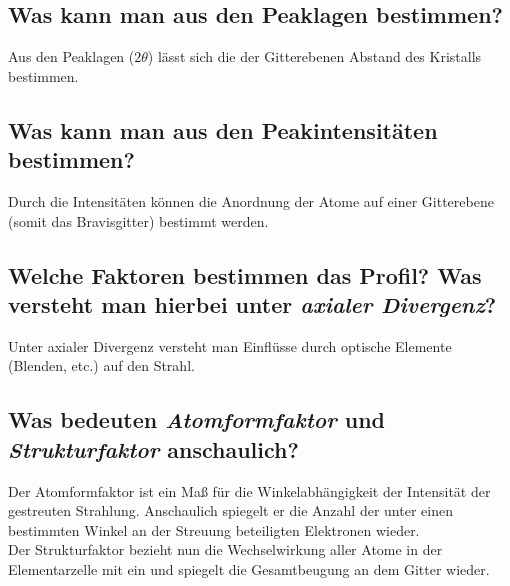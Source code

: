 \subsection*{Was kann man aus den Peaklagen bestimmen?}
Aus den Peaklagen ($2\theta$) lässt sich die der Gitterebenen Abstand des Kristalls bestimmen.
\subsection*{Was kann man aus den Peakintensitäten bestimmen?}
Durch die Intensitäten können die Anordnung der Atome auf einer Gitterebene (somit das Bravisgitter) bestimmt werden.
\subsection*{Welche Faktoren bestimmen das Profil? Was versteht man hierbei unter \textit{axialer Divergenz}?}
Unter axialer Divergenz versteht man Einflüsse durch optische Elemente (Blenden, etc.) auf den Strahl. \cite{Kleber}
\subsection*{Was bedeuten \textit{Atomformfaktor} und \textit{Strukturfaktor} anschaulich?}
Der Atomformfaktor ist ein Maß für die Winkelabhängigkeit der Intensität der gestreuten Strahlung.
Anschaulich spiegelt er die Anzahl der unter einen bestimmten Winkel an der Streuung beteiligten Elektronen wieder.\\
Der Strukturfaktor bezieht nun die Wechselwirkung aller Atome in der Elementarzelle mit ein und spiegelt die Gesamtbeugung an dem Gitter wieder.
